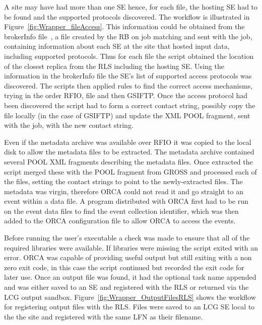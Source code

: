 A site may have had more than one SE hence, for each file, the hosting SE had to be found and the supported protocols discovered. The workflow is illustrated in Figure~\ref{fig:Wrapper_fileAccess}. This information could be obtained from the brokerInfo file~\cite{citeulike:835506}, a file created by the RB on job matching and sent with the job, containing information about each SE at the site that hosted input data, including supported protocols. Thus for each file the script obtained the location of the closest replica from the RLS including the hosting SE. Using the information in the brokerInfo file the SE's list of supported access protocols was discovered. The scripts then applied rules to find the correct access mechanisms, trying in the order RFIO, file and then GSIFTP. Once the access protocol had been discovered the script had to form a correct contact string, possibly copy the file locally (in the case of GSIFTP) and update the XML POOL fragment, sent with the job, with the new contact string. 

Even if the metadata archive was available over RFIO it was copied to the local disk to allow the metadata files to be extracted. 
The metadata archive contained several POOL XML fragments describing the metadata files. Once extracted the script merged these with the POOL fragment from GROSS and processed each of the files, setting the contact strings to point to the newly-extracted files. The metadata was virgin, therefore ORCA could not read it and go straight to an event within a data file. A program distributed with ORCA first had to be run on the event data files to find the event collection identifier, which was then added to the ORCA configuration file to allow ORCA to access the events.

Before running the user's executable a check was made to ensure that all of the required libraries were available. If libraries were missing the script exited with an error. ORCA was capable of providing useful output but still exiting with a non zero exit code, in this case the script continued but recorded the exit code for later use. Once an output file was found, it had the optional task name appended and was either saved to an SE and registered with the RLS or returned via the LCG output sandbox. Figure~\ref{fig:Wrapper_OutputFilesRLS} shows the workflow for registering output files with the RLS. Files were saved to an LCG SE local to the the site and registered with the same LFN as their filename.

